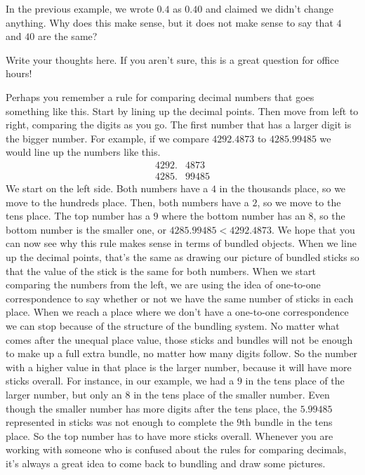 \documentclass{ximera}
\begin{document}
\begin{question}
In the previous example, we wrote $0.4$ as $0.40$ and claimed we didn't change anything. Why does this make sense, but it does not make sense to say that $4$ and $40$ are the same?
\begin{freeResponse}
Write your thoughts here. If you aren't sure, this is a great question for office hours!
\end{freeResponse}
\end{question}

Perhaps you remember a rule for comparing decimal numbers that goes something like this. Start by lining up the decimal points. Then move from left to right, comparing the digits as you go. The first number that has a larger digit is the bigger number. For example, if we compare $4292.4873$ to $4285.99485$ we would line up the numbers like this.
\begin{align*}
4292.&4873\\
4285.&99485
\end{align*}
We start on the left side. Both numbers have a $4$ in the thousands place, so we move to the hundreds place. Then, both numbers have a $2$, so we move to the tens place. The top number has a $9$ where the bottom number has an $8$, so the bottom number is the smaller one, or $4285.99485 < 4292.4873$. We hope that you can now see why this rule makes sense in terms of bundled objects. When we line up the decimal points, that's the same as drawing our picture of bundled sticks so that the value of the stick is the same for both numbers. When we start comparing the numbers from the left, we are using the idea of one-to-one correspondence to say whether or not we have the same number of sticks in each place. When we reach a place where we don't have a one-to-one correspondence we can stop because of the structure of the bundling system. No matter what comes after the unequal place value, those sticks and bundles will not be enough to make up a full extra bundle, no matter how many digits follow. So the number with a higher value in that place is the larger number, because it will have more sticks overall. For instance, in our example, we had a $9$ in the tens place of the larger number, but only an $8$ in the tens place of the smaller number. Even though the smaller number has more digits after the tens place, the $5.99485$ represented in sticks was not enough to complete the $9$th bundle in the tens place. So the top number has to have more sticks overall. Whenever you are working with someone who is confused about the rules for comparing decimals, it's always a great idea to come back to bundling and draw some pictures.
\end{document}
